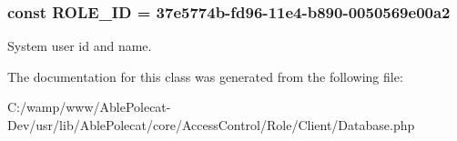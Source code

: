 \subsubsection[{R\+O\+L\+E\+\_\+\+I\+D}]{\setlength{\rightskip}{0pt plus 5cm}const R\+O\+L\+E\+\_\+\+I\+D = \textquotesingle{}37e5774b-\/fd96-\/11e4-\/b890-\/0050569e00a2\textquotesingle{}}\label{class_able_polecat___access_control___role___client___database_a26e65ac69fe81338080fb11db5e43752}
System user id and name. 

The documentation for this class was generated from the following file\+:\begin{DoxyCompactItemize}
\item 
C\+:/wamp/www/\+Able\+Polecat-\/\+Dev/usr/lib/\+Able\+Polecat/core/\+Access\+Control/\+Role/\+Client/Database.\+php\end{DoxyCompactItemize}
